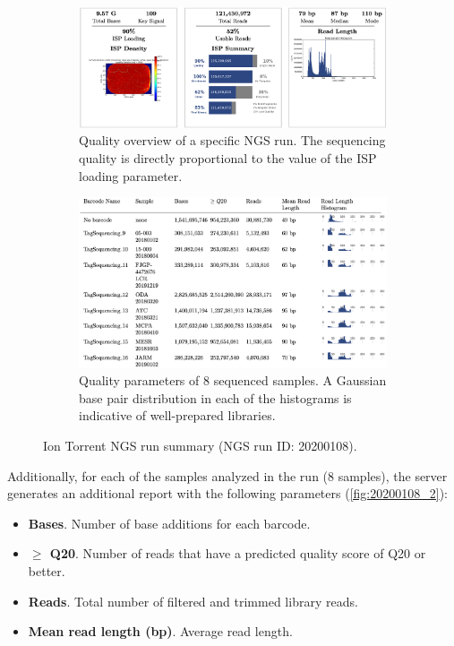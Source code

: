 \begin{figure}[ht]
    \centering
    \begin{subfigure}{0.85\textwidth}
        \centering
        \includegraphics[width=\textwidth]{Images/chapter_3/20200108/20200108_1.png}
        \caption{Quality overview of a specific NGS run. The sequencing quality is directly proportional to the value of the ISP loading parameter. \\}
        \label{fig:20200108_1}
    \end{subfigure}
    \hfill
    \begin{subfigure}{0.85\textwidth}
        \centering
        \includegraphics[width=\textwidth]{Images/chapter_3/20200108/20200108_2.png}
        \caption{Quality parameters of 8 sequenced samples. A Gaussian  base pair distribution in each of the histograms is indicative of well-prepared libraries.}
        \label{fig:20200108_2}
    \end{subfigure}
    \hfill
    \caption{Ion Torrent NGS run summary (NGS run ID: 20200108).}
    \label{fig:NGS_summary}
\end{figure}

Additionally, for each of the samples analyzed in the run (8 samples), the server generates an additional report with the following parameters (\autoref{fig:20200108_2}):
\begin{itemize}
    \item \textbf{Bases}. Number of base additions for each barcode.
    \item \textbf{$\boldsymbol{\ge}$ Q20}. Number of reads that have a predicted quality score of Q20 or better.
    \item \textbf{Reads}. Total number of filtered and trimmed library reads.
    \item \textbf{Mean read length (bp)}. Average read length.
\end{itemize}

